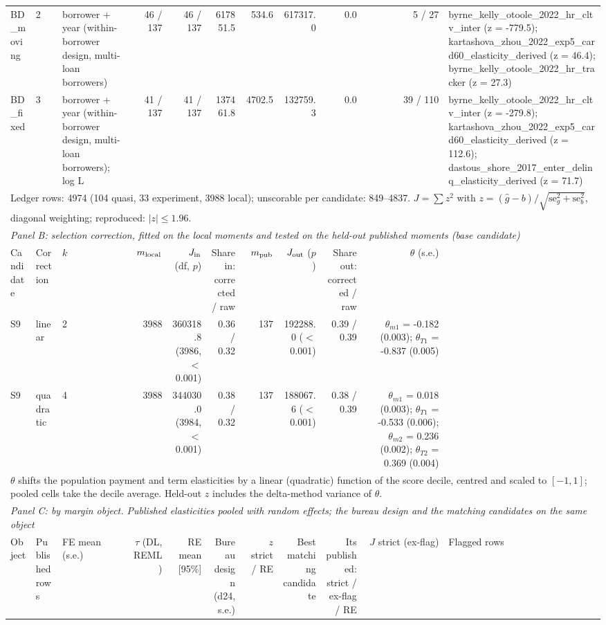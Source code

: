 \begin{tabular}{llp{4.2cm}rrrrrrrp{4.6cm}}
BD_moving & 2 & borrower + year (within-borrower design, multi-loan borrowers) & 46 / 137 & 46 / 137 & 617851.5 & 534.6 & 617317.0 & 0.0 & 5 / 27 & byrne\_kelly\_otoole\_2022\_hr\_cltv\_inter (z = -779.5); kartashova\_zhou\_2022\_exp5\_card60\_elasticity\_derived (z = 46.4); byrne\_kelly\_otoole\_2022\_hr\_tracker (z = 27.3) \\
BD_fixed & 3 & borrower + year (within-borrower design, multi-loan borrowers); log L & 41 / 137 & 41 / 137 & 137461.8 & 4702.5 & 132759.3 & 0.0 & 39 / 110 & byrne\_kelly\_otoole\_2022\_hr\_cltv\_inter (z = -279.8); kartashova\_zhou\_2022\_exp5\_card60\_elasticity\_derived (z = 112.6); dastous\_shore\_2017\_enter\_delinq\_elasticity\_derived (z = 71.7) \\
\multicolumn{11}{l}{\footnotesize Ledger rows: 4974 (104 quasi, 33 experiment, 3988 local); unscorable per candidate: 849--4837. $J = \sum z^2$ with $z = (\hat g - b)/\sqrt{\mathrm{se}_g^2 + \mathrm{se}_b^2}$, diagonal weighting; reproduced: $|z| \le 1.96$.} \\
\midrule
\multicolumn{11}{l}{\textit{Panel B: selection correction, fitted on the local moments and tested on the held-out published moments (base candidate)}} \\
Candidate & Correction & $k$ & $m_{\rm local}$ & $J_{\rm in}$ (df, $p$) & Share in: corrected / raw & $m_{\rm pub}$ & $J_{\rm out}$ ($p$) & Share out: corrected / raw & $\theta$ (s.e.) \\
\midrule
S9 & linear & 2 & 3988 & 360318.8 (3986, $<$0.001) & 0.36 / 0.32 & 137 & 192288.0 ($<$0.001) & 0.39 / 0.39 & $\theta_{m1}$ = -0.182 (0.003); $\theta_{T1}$ = -0.837 (0.005) \\
S9 & quadratic & 4 & 3988 & 344030.0 (3984, $<$0.001) & 0.38 / 0.32 & 137 & 188067.6 ($<$0.001) & 0.38 / 0.39 & $\theta_{m1}$ = 0.018 (0.003); $\theta_{T1}$ = -0.533 (0.006); $\theta_{m2}$ = 0.236 (0.002); $\theta_{T2}$ = 0.369 (0.004) \\
\multicolumn{11}{l}{\footnotesize $\theta$ shifts the population payment and term elasticities by a linear (quadratic) function of the score decile, centred and scaled to $[-1, 1]$; pooled cells take the decile average. Held-out $z$ includes the delta-method variance of $\theta$.} \\
\midrule
\multicolumn{11}{l}{\textit{Panel C: by margin object. Published elasticities pooled with random effects; the bureau design and the matching candidates on the same object}} \\
Object & Published rows & FE mean (s.e.) & $\tau$ (DL, REML) & RE mean [95\%] & Bureau design (d24, s.e.) & $z$ strict / RE & Best matching candidate & Its published: strict / ex-flag / RE & $J$ strict (ex-flag) & Flagged rows \\

\end{tabular}

